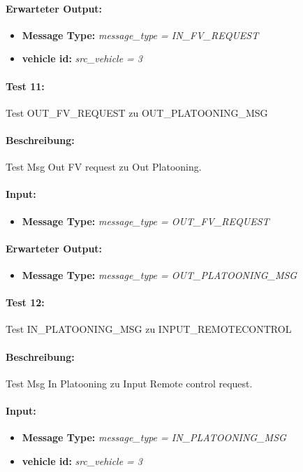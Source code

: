 \documentclass[a4paper, 12pt, titlepage]{scrartcl}
\begin{document}
{			\paragraph{Erwarteter Output:}
			\begin{itemize} \itemsep-0.5em
				\item \textbf{Message Type:} \emph{message\_type = IN\_FV\_REQUEST}
				\item \textbf{vehicle id:} \emph{src\_vehicle = 3}
			\end{itemize}

			\paragraph{Test 11:}{Test OUT\_FV\_REQUEST zu OUT\_PLATOONING\_MSG}
			\paragraph{Beschreibung:} Test Msg Out FV request zu Out Platooning.
			\paragraph{Input:}
			\begin{itemize} \itemsep-0.5em
				\item \textbf{Message Type:} \emph{message\_type = OUT\_FV\_REQUEST}
			\end{itemize}
			\paragraph{Erwarteter Output:}
			\begin{itemize} \itemsep-0.5em
				\item \textbf{Message Type:} \emph{message\_type = OUT\_PLATOONING\_MSG}
			\end{itemize}	
			
			\paragraph{Test 12:}{Test IN\_PLATOONING\_MSG zu INPUT\_REMOTECONTROL}
			\paragraph{Beschreibung:} Test Msg In Platooning zu Input Remote control request.
			\paragraph{Input:}
			\begin{itemize} \itemsep-0.5em
				\item \textbf{Message Type:} \emph{message\_type = IN\_PLATOONING\_MSG}
				\item \textbf{vehicle id:} \emph{src\_vehicle = 3}
			\end{itemize}
}
\end{document}
